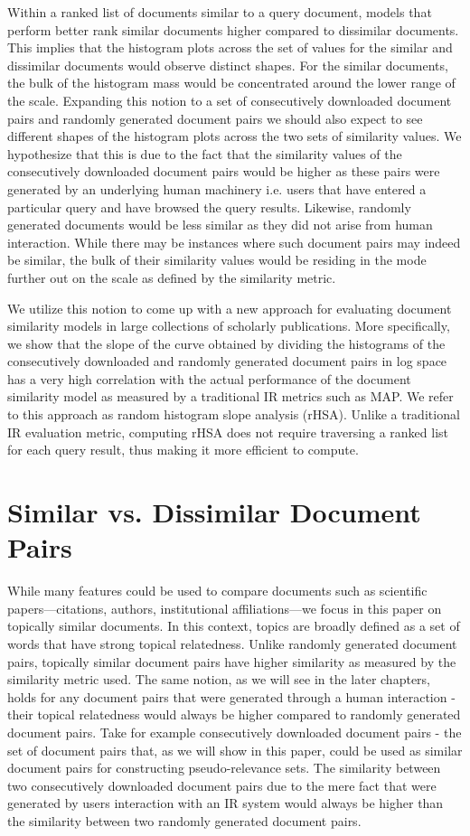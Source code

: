 \documentclass[letterpaper]{article}
\begin{document}
Within a ranked list of documents similar to a query document, models that perform better rank similar documents higher compared to dissimilar documents. This implies that the histogram plots across the set of values for the similar and dissimilar documents would observe distinct shapes. For the similar documents, the bulk of the histogram mass would be concentrated around the lower range of the scale. 
Expanding this notion to a set of consecutively downloaded document pairs and randomly generated document pairs we should also expect to see different shapes of the histogram plots across the two sets of similarity values. We hypothesize that this is due to the fact that the similarity values of the consecutively downloaded document pairs would be higher as these pairs were generated by an underlying human machinery i.e. users that have entered a particular query and have browsed the query results. Likewise, randomly generated documents would be less similar as they did not arise from human interaction. While there may be instances where such document pairs may indeed be similar, the bulk of their similarity values would be residing in the mode further out on the scale as defined by the similarity metric. 

We utilize this notion to come up with a new approach for evaluating document similarity models in large collections of scholarly publications. More specifically, we show that the slope of the curve obtained by dividing the histograms of the consecutively downloaded and randomly generated document pairs in log space has a very high correlation with the actual performance of the document similarity model as measured by a traditional IR metrics such as MAP. We refer to this approach as random histogram slope analysis (rHSA). Unlike a traditional IR evaluation metric, computing rHSA does not require traversing a ranked list for each query result, thus making it more efficient to compute.

\section{Similar vs. Dissimilar Document Pairs}

While many features could be used to compare documents such as scientific papers---citations, authors, institutional affiliations---we focus in this paper on topically similar documents.  In this context, topics are broadly defined as a set of words that have strong topical relatedness. Unlike randomly generated document pairs, topically similar document pairs have higher similarity as measured by the similarity metric used. The same notion, as we will see in the later chapters, holds for any document pairs that were generated through a human interaction - their topical relatedness would always be higher compared to randomly generated document pairs. Take for example consecutively downloaded document pairs - the set of document pairs that, as we will show in this paper, could be used as similar document pairs for constructing pseudo-relevance sets. The similarity between two consecutively downloaded document pairs due to the mere fact that were generated by users interaction with an IR system would always be higher than the similarity between two randomly generated document pairs.
\end{document}
